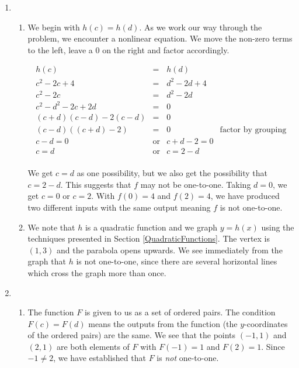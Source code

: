 \begin{ex}
\begin{enumerate}
\begin{center}
\begin{tabular}{m{2.5in}m{2.5in}}
\end{tabular}

\end{center}

\item  \begin{enumerate} \item  We begin with $h(c) = h(d)$.  As we work our way through the problem, we encounter a nonlinear equation.  We move the non-zero terms to the left, leave a $0$ on the right and factor accordingly.

\[ \begin{array}{rclr}

h(c) & = & h(d) & \\
c^2 - 2c+4 & = & d^2 - 2d+4 & \\

c^2 - 2c & = & d^2 - 2d & \\

c^2 - d^2 - 2c + 2d & = & 0 & \\

(c+d)(c-d) - 2(c-d) & = & 0 & \\

(c-d)((c+d) -2) & = & 0 & \mbox{factor by grouping} \\

c-d = 0 & \mbox{or} & c+d -2 = 0 & \\

c = d & \mbox{or} & c = 2-d & \\

\end{array} \]

We get $c=d$ as one possibility, but we also get the possibility that $c=2-d$.  This suggests that $f$ may not be one-to-one.  Taking $d=0$, we get $c = 0$ or $c = 2$.  With $f(0) = 4$ and $f(2) = 4$, we have produced two different inputs with the same output meaning $f$ is not one-to-one.

\item  We note that $h$ is a quadratic function and we graph $y=h(x)$ using the techniques presented in Section \ref{QuadraticFunctions}.  The vertex is $(1,3)$ and the parabola opens upwards.  We see immediately from the graph that $h$ is not one-to-one, since there are several horizontal lines which cross the graph more than once.

\end{enumerate}

\item  \begin{enumerate} \item The function $F$ is given to us as a set of ordered pairs.  The condition $F(c)=F(d)$ means the outputs from the function (the $y$-coordinates of the ordered pairs) are the same.  We see that the points $(-1,1)$ and $(2,1)$ are both elements of $F$ with $F(-1)=1$ and $F(2) = 1$.  Since $-1 \neq 2$, we have established that $F$ is \textit{not} one-to-one.


\end{enumerate}
\end{enumerate}
\end{ex}
